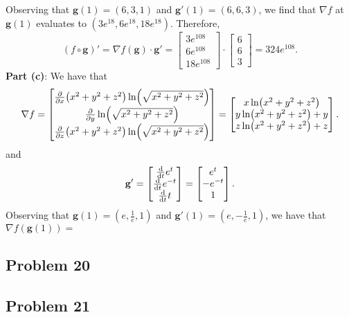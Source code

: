\documentclass[11pt]{article}
\newcommand{\mat}[1]{\mathbf{#1}}
\renewcommand{\grad}{\nabla}
\begin{document}
Observing that $\mat{g}(1) = (6, 3, 1)$ and $\mat{g}'(1) = (6, 6, 3)$, we find that $\grad f$ at $\mat{g}(1)$ evaluates to $(3 e^{18}, 6 e^{18}, 18 e^{18})$. Therefore,
\[
	(f \circ \mat{g})' = \grad f (\mat{g}) \cdot \mat{g}' = \begin{bmatrix} 3 e^{108} \\ 6 e^{108} \\ 18 e^{108} \end{bmatrix} \cdot \begin{bmatrix} 6 \\ 6 \\ 3 \end{bmatrix} = \boxed{324 e^{108}}.
\]
\textbf{Part (c)}: We have that
\[
	\grad f = \begin{bmatrix} \pdv{x} (x^{2} + y^{2} + z^{2}) \ln(\sqrt{x^{2} + y^{2} + z^{2}}) \\ \pdv{y} \ln(\sqrt{x^{2} + y^{2} + z^{2}}) \\ \pdv{z} (x^{2} + y^{2} + z^{2}) \ln(\sqrt{x^{2} + y^{2} + z^{2}})\end{bmatrix} = \begin{bmatrix} x \ln(x^{2} + y^{2} + z^{2}) \\ y \ln(x^{2} + y^{2} + z^{2}) + y \\ z \ln(x^{2} + y^{2} + z^{2}) + z \end{bmatrix}.
\]
and
\[
	\mat{g}' = \begin{bmatrix} \dv{t} e^{t} \\ \dv{t} e^{-t} \\ \dv{t} t \end{bmatrix} = \begin{bmatrix} e^{t} \\ -e^{-t} \\ 1 \end{bmatrix}.
\]
Observing that $\mat{g}(1) = (e, \tfrac{1}{e}, 1)$ and $\mat{g}'(1) = (e, -\tfrac{1}{e}, 1)$, we have that $\grad f (\mat{g}(1)) = $


\subsection{Problem 20}




\subsection{Problem 21}
\end{document}

